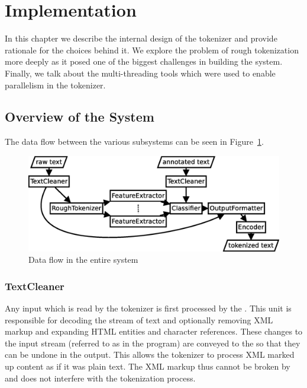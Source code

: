\section{Implementation}
\label{chap:impl}

In this chapter we describe the internal design of the tokenizer and provide
rationale for the choices behind it. We explore the problem of rough
tokenization more deeply as it posed one of the biggest challenges in building
the system. Finally, we talk about the multi-threading tools which were used to
enable parallelism in the tokenizer.


\subsection{Overview of the System}
\label{sec:impl-overview}

The data flow between the various subsystems can be seen in
Figure~\ref{fig:all-parts}.

\begin{figure}
  \begin{center}
    \includegraphics[width=\textwidth]{img/all-parts.eps}
    \caption{Data flow in the entire system}
    \label{fig:all-parts}
  \end{center}
\end{figure}

\subsubsection{TextCleaner}
\label{ssec:impl-overview-textcleaner}

Any input which is read by the tokenizer is first processed by the
. This unit is responsible for decoding the stream of text
and optionally removing XML markup and expanding HTML entities and character
references. These changes to the input stream (referred to as 
in the program) are conveyed to the  so that they can be
undone in the output. This allows the tokenizer to process XML marked up
content as if it was plain text. The XML markup thus cannot be broken by and
does not interfere with the tokenization process.

